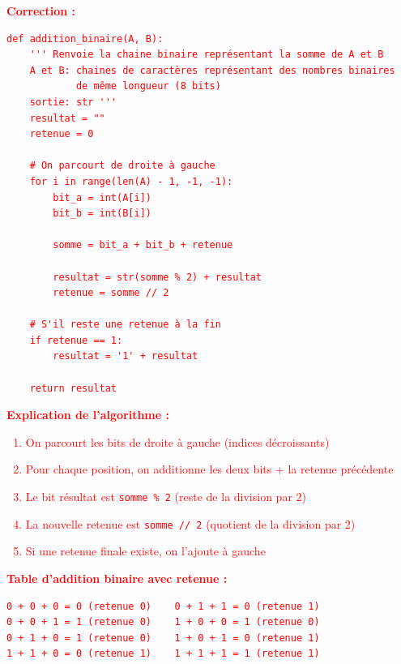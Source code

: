 \documentclass[a4paper,10pt]{report}
\begin{document}
\textcolor{red}{
\textbf{Correction :}
\begin{verbatim}
def addition_binaire(A, B):
    ''' Renvoie la chaine binaire représentant la somme de A et B
    A et B: chaines de caractères représentant des nombres binaires 
            de même longueur (8 bits)
    sortie: str '''
    resultat = ""
    retenue = 0
    
    # On parcourt de droite à gauche
    for i in range(len(A) - 1, -1, -1):
        bit_a = int(A[i])
        bit_b = int(B[i])
        
        somme = bit_a + bit_b + retenue
        
        resultat = str(somme % 2) + resultat
        retenue = somme // 2
    
    # S'il reste une retenue à la fin
    if retenue == 1:
        resultat = '1' + resultat
    
    return resultat
\end{verbatim}

\textbf{Explication de l'algorithme :}
\begin{enumerate}
    \item On parcourt les bits de droite à gauche (indices décroissants)
    \item Pour chaque position, on additionne les deux bits + la retenue précédente
    \item Le bit résultat est \verb|somme % 2| (reste de la division par 2)
    \item La nouvelle retenue est \verb|somme // 2| (quotient de la division par 2)
    \item Si une retenue finale existe, on l'ajoute à gauche
\end{enumerate}

\textbf{Table d'addition binaire avec retenue :}
\begin{verbatim}
0 + 0 + 0 = 0 (retenue 0)    0 + 1 + 1 = 0 (retenue 1)
0 + 0 + 1 = 1 (retenue 0)    1 + 0 + 0 = 1 (retenue 0)
0 + 1 + 0 = 1 (retenue 0)    1 + 0 + 1 = 0 (retenue 1)
1 + 1 + 0 = 0 (retenue 1)    1 + 1 + 1 = 1 (retenue 1)
\end{verbatim}
}
\end{document}
